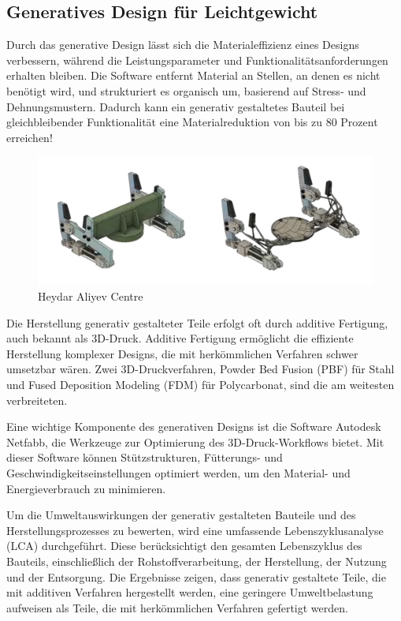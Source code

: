 \subsection*{Generatives Design für Leichtgewicht}

Durch das generative Design lässt sich die Materialeffizienz eines Designs verbessern, während die Leistungsparameter und Funktionalitätsanforderungen erhalten bleiben. Die Software entfernt Material an Stellen, an denen es nicht benötigt wird, und strukturiert es organisch um, basierend auf Stress- und Dehnungsmustern. Dadurch kann ein generativ gestaltetes Bauteil bei gleichbleibender Funktionalität eine Materialreduktion von bis zu 80 Prozent erreichen!

\begin{figure}[h]
  \begin{minipage}{0.5\textwidth}
    \centering
    \includegraphics[width=\textwidth]{./images/WhatsApp Image 2023-06-11 at 23.48.25.jpeg}
  \end{minipage}
  \caption{Heydar Aliyev Centre}
  \label{fig:meinbild}
\end{figure}

Die Herstellung generativ gestalteter Teile erfolgt oft durch additive Fertigung, auch bekannt als 3D-Druck. Additive Fertigung ermöglicht die effiziente Herstellung komplexer Designs, die mit herkömmlichen Verfahren schwer umsetzbar wären. Zwei 3D-Druckverfahren, Powder Bed Fusion (PBF) für Stahl und Fused Deposition Modeling (FDM) für Polycarbonat, sind die am weitesten verbreiteten.

Eine wichtige Komponente des generativen Designs ist die Software Autodesk Netfabb, die Werkzeuge zur Optimierung des 3D-Druck-Workflows bietet. Mit dieser Software können Stützstrukturen, Fütterungs- und Geschwindigkeitseinstellungen optimiert werden, um den Material- und Energieverbrauch zu minimieren.

Um die Umweltauswirkungen der generativ gestalteten Bauteile und des Herstellungsprozesses zu bewerten, wird eine umfassende Lebenszyklusanalyse (LCA) durchgeführt. Diese berücksichtigt den gesamten Lebenszyklus des Bauteils, einschließlich der Rohstoffverarbeitung, der Herstellung, der Nutzung und der Entsorgung. Die Ergebnisse zeigen, dass generativ gestaltete Teile, die mit additiven Verfahren hergestellt werden, eine geringere Umweltbelastung aufweisen als Teile, die mit herkömmlichen Verfahren gefertigt werden.



